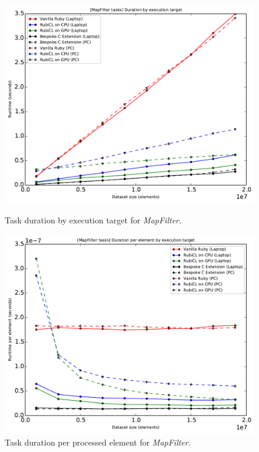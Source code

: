 \begin{figure}[H]
  \centering
  \includegraphics[width=\textwidth]{./graphing/mapfilter/runtimes.pdf}
  \caption{Task duration by execution target for \emph{MapFilter}.}
  \label{fig:mfilter_task_runtime_g}

  \includegraphics[width=\textwidth]{./graphing/mapfilter/per_element.pdf}
  \caption{Task duration per processed element for \emph{MapFilter}.}
  \label{fig:mfilter_task_per_el_g}

\end{figure}

